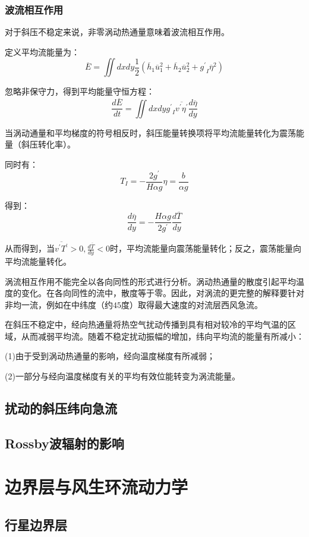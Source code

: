 \documentclass{article}
\begin{document}
\subsubsection{波流相互作用}
对于斜压不稳定来说，非零涡动热通量意味着波流相互作用。

定义平均流能量为：
$$\overline{E}=\iint{dxdy\frac{1}{2}}({{\overline{h}}_{1}}\overline{u}_{1}^{2}+{{\overline{h}}_{2}}\overline{u}_{2}^{2}+{{{g}^{\prime}}_{I}}{{\overline{\eta }}^{2}})$$

忽略非保守力，得到平均能量守恒方程：
$$\frac{d\overline{E}}{dt}=\iint{dxdy}{{{g}^{\prime}}_{I}}\overline{{v}^{\prime}{\eta }^{\prime}}\frac{d\overline{\eta }}{dy}$$

当涡动通量和平均梯度的符号相反时，斜压能量转换项将平均流能量转化为震荡能量（斜压转化率）。

同时有：
$$T_I = -\frac{2g^{\prime}}{H\alpha g}\eta = \frac{b}{\alpha g }$$

得到：
$$\frac{d\overline{\eta }}{dy} = -\frac{H\alpha g}{2g^{\prime}}\frac{d\overline{T}}{dy}$$

从而得到，当$\overline{v^{\prime}T^{\prime}}>0, \frac{d\overline{T}}{dy}<0$时，平均流能量向震荡能量转化；反之，震荡能量向平均流能量转化。

涡流相互作用不能完全以各向同性的形式进行分析。涡动热通量的散度引起平均温度的变化。在各向同性的流中，散度等于零。因此，对涡流的更完整的解释要针对非均一流，例如在中纬度（约$45$度）取得最大速度的对流层西风急流。

在斜压不稳定中，经向热通量将热空气扰动传播到具有相对较冷的平均气温的区域，从而减弱平均流。随着不稳定扰动振幅的增加，纬向平均流的能量有所减小：

(1)由于受到涡动热通量的影响，经向温度梯度有所减弱；

(2)一部分与经向温度梯度有关的平均有效位能转变为涡流能量。


\subsection{扰动的斜压纬向急流}
\subsection{Rossby波辐射的影响}

\section{边界层与风生环流动力学}
\subsection{行星边界层}
\end{document}
